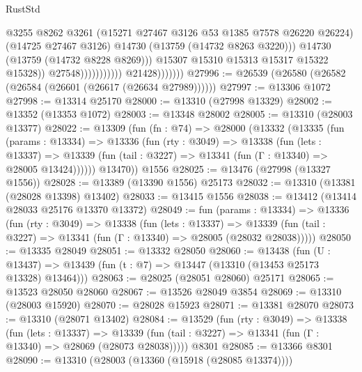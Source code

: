 \begin{lexlean}{RustStd}
\begin{coremodule}
                                                @3255
                                                @8262
                                                @3261
                                                (@15271 @27467 @3126 @53 @1385 @7578 @26220 @26224)
                                                (@14725 @27467 @3126)
                                                @14730
                                                (@13759 (@14732 @8263 @3220)))
                                              @14730
                                              (@13759 (@14732 @8228 @8269)))
                                            @15307
                                            @15310
                                            @15313
                                            @15317
                                            @15322
                                            @15328))
                                        @27548)))))))))))
                  @21428)))))))
@27996 := @26539 (@26580 (@26582 (@26584 (@26601 (@26617 (@26634 @27989))))))
@27997 := @13306 @1072
@27998 := @13314 @25170
@28000 := @13310 (@27998 @13329)
@28002 := @13352 (@13353 @1072)
@28003 := @13348 @28002
@28005 := @13310 (@28003 @13377)
@28022 := @13309
    (fun (fn : @74) =>
    @28000
      (@13332
        (@13335
          (fun (params : @13334) =>
          @13336
            (fun (rty : @3049) =>
            @13338
              (fun (lets : @13337) =>
              @13339 (fun (tail : @3227) => @13341 (fun (Γ : @13340) => @28005 @13424))))))
        @13470))
    @1556
@28025 := @13476 (@27998 (@13327 @1556))
@28028 := @13389 (@13390 @1556) @25173
@28032 := @13310 (@13381 (@28028 @13398) @13402)
@28033 := @13415 @1556
@28038 := @13412 (@13414 @28033 @25176 @13370 @13372)
@28049 := fun (params : @13334) =>
  @13336
    (fun (rty : @3049) =>
    @13338
      (fun (lets : @13337) =>
      @13339 (fun (tail : @3227) => @13341 (fun (Γ : @13340) => @28005 (@28032 @28038)))))
@28050 := @13335 @28049
@28051 := @13332 @28050
@28060 := @13438
    (fun (U : @13437) => @13439 (fun (t : @7) => @13447 (@13310 (@13453 @25173 @13328) @13464)))
@28063 := @28025 (@28051 @28060) @25171
@28065 := @13523 @28050 @28060
@28067 := @13526 @28049 @3854
@28069 := @13310 (@28003 @15920)
@28070 := @28028 @15923
@28071 := @13381 @28070
@28073 := @13310 (@28071 @13402)
@28084 := @13529
    (fun (rty : @3049) =>
    @13338
      (fun (lets : @13337) =>
      @13339 (fun (tail : @3227) => @13341 (fun (Γ : @13340) => @28069 (@28073 @28038)))))
    @8301
@28085 := @13366 @8301
@28090 := @13310 (@28003 (@13360 (@15918 (@28085 @13374))))

\end{coremodule}
\end{lexlean}
